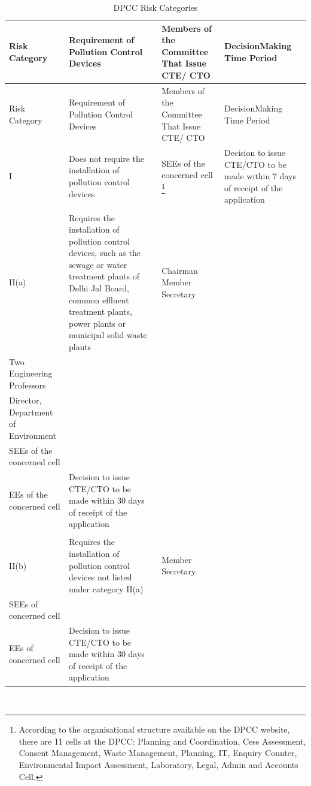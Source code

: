 \documentclass[a4paper, 12pt]{article}
\newcommand\tabitem{\makebox[1em][r]{\textbullet~}}
\begin{document}
\begin{longtable}{>{\raggedright}p{2cm}>{\raggedright}p{4cm}>{\raggedright}p{4cm}>{\raggedright\arraybackslash}p{4cm}}
\caption{DPCC Risk Categories} \\
\toprule
Risk Category & Requirement of Pollution Control Devices & Members of the Committee That Issue CTE/ CTO & DecisionMaking Time Period \\
\midrule
\endfirsthead
Risk Category & Requirement of Pollution Control Devices & Members of the Committee That Issue CTE/ CTO & DecisionMaking Time Period \\
\midrule
\endhead
\endfoot
\endlastfoot
I & Does not require the installation of pollution control devices & SEEs of the concerned cell \footnote{According to the organisational structure available on the DPCC website, there are 11 cells at the DPCC: Planning and Coordination, Cess Assessment, Consent Management, Waste Management, Planning, IT, Enquiry Counter, Environmental Impact Assessment, Laboratory, Legal, Admin and Accounts Cell.} & Decision to issue CTE/CTO to be made within 7 days of receipt of the application \\
 & & &  \\
II(a) & Requires the installation of pollution control devices, such as the sewage or water treatment plants of Delhi Jal Board, common effluent treatment plants, power plants or municipal solid waste plants & \tabitem Chairman  \tabitem Member Secretary \\  \tabitem Two Engineering Professors \\ \tabitem Director, Department of Environment \\ \tabitem SEEs of the concerned cell \\ \tabitem EEs of the concerned cell 
 & Decision to issue CTE/CTO to be made within 30 days of receipt of the application \\
  & & & \\
II(b) & Requires the installation of pollution control devices not listed under category II(a) & \tabitem Member Secretary \\ \tabitem SEEs of concerned cell \\ \tabitem  EEs of concerned cell & Decision to issue CTE/CTO to be made within 30 days of receipt of the application \\
\bottomrule
\end{longtable}
\textit{\parencite{DPCC17}}\\
         
\end{document}
